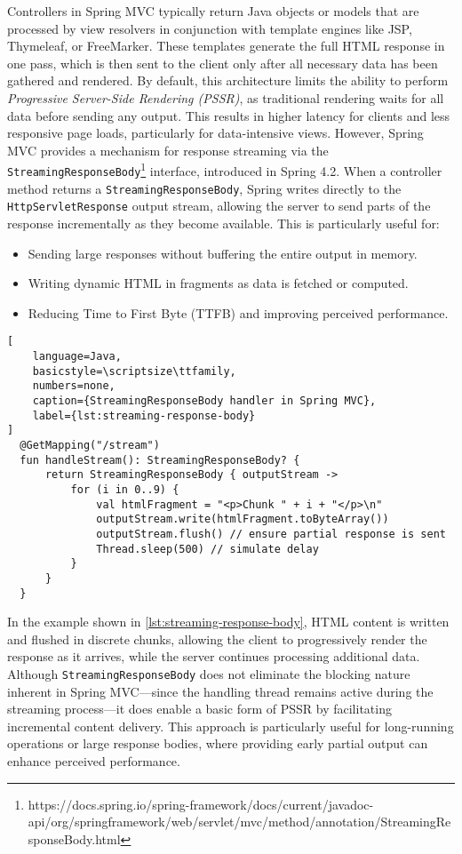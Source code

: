 Controllers in Spring MVC typically return Java objects or models that are
processed by view resolvers in conjunction with template engines like JSP,
Thymeleaf, or FreeMarker. These templates generate the full HTML response in
one pass, which is then sent to the client only after all necessary data has
been gathered and rendered. By default, this architecture limits the ability to
perform \textit{Progressive Server-Side Rendering (PSSR)}, as traditional
rendering waits for all data before sending any output. This results in higher
latency for clients and less responsive page loads, particularly for
data-intensive views. However, Spring MVC provides a mechanism for response
streaming via the \texttt{StreamingResponseBody}\footnote{https://docs.spring.io/spring-framework/docs/current/javadoc-api/org/springframework/web/servlet/mvc/method/annotation/StreamingResponseBody.html} interface, introduced in
Spring 4.2. When a controller method returns a \texttt{StreamingResponseBody},
Spring writes directly to the \texttt{HttpServletResponse} output stream,
allowing the server to send parts of the response incrementally as they become
available. This is particularly useful for:
\begin{itemize}
  \item Sending large responses without buffering the entire output in memory.
  \item Writing dynamic HTML in fragments as data is fetched or computed.
  \item Reducing Time to First Byte (TTFB) and improving perceived performance.
\end{itemize}

\begin{lstlisting}[
    language=Java,
    basicstyle=\scriptsize\ttfamily,
    numbers=none,
    caption={StreamingResponseBody handler in Spring MVC},
    label={lst:streaming-response-body}
]
  @GetMapping("/stream")
  fun handleStream(): StreamingResponseBody? {
      return StreamingResponseBody { outputStream ->
          for (i in 0..9) {
              val htmlFragment = "<p>Chunk " + i + "</p>\n"
              outputStream.write(htmlFragment.toByteArray())
              outputStream.flush() // ensure partial response is sent
              Thread.sleep(500) // simulate delay
          }
      }
  }
\end{lstlisting}

In the example shown in \autoref{lst:streaming-response-body}, HTML content is written and flushed in discrete chunks,
allowing the client to progressively render the response as it arrives, while
the server continues processing additional data. Although
\texttt{StreamingResponseBody} does not eliminate the blocking nature inherent
in Spring MVC—since the handling thread remains active during the streaming
process—it does enable a basic form of PSSR by facilitating incremental content
delivery. This approach is particularly useful for long-running operations or
large response bodies, where providing early partial output can enhance
perceived performance.

